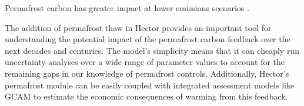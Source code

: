 \documentclass[essd, manuscript]{copernicus}
\begin{document}
Permafrost carbon has greater impact at lower emissions scenarios \citep{burke_2017_quantifying, macdougall_2012_significant, macdougall_2013_if} .


\conclusions  %
The addition of permafrost thaw in Hector provides an important tool for understanding the potential impact of the permafrost carbon feedback over the next decades and centuries. The model’s simplicity means that it can cheaply run uncertainty analyses over a wide range of parameter values to account for the remaining gaps in our knowledge of permafrost controls. Additionally, Hector's permafrost module can be easily coupled with integrated assessment models like GCAM to estimate the economic consequences of warming from this feedback.


















\end{document}
